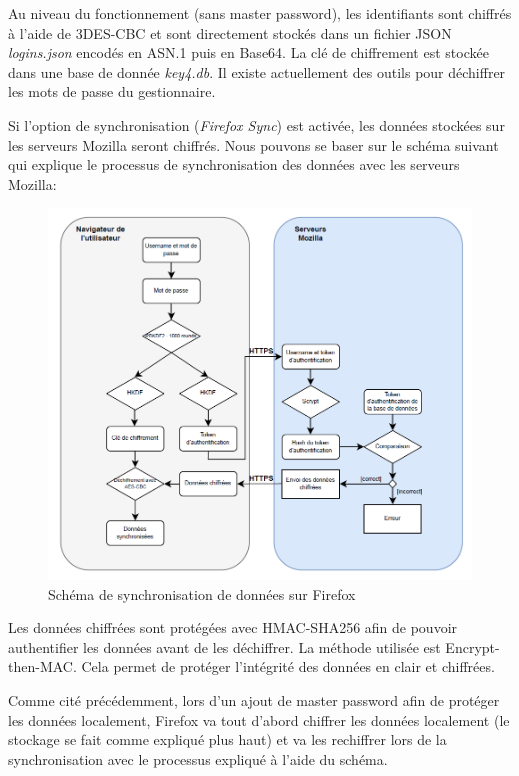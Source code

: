 Au niveau du fonctionnement\cite{firefoxEncr} (sans master password), les identifiants sont chiffrés à l'aide de 3DES-CBC et sont directement stockés dans un fichier JSON \textit{logins.json} encodés en ASN.1 puis en Base64. La clé de chiffrement est stockée dans une base de donnée \textit{key4.db}. Il existe actuellement des outils pour déchiffrer les mots de passe du gestionnaire.

Si l'option de synchronisation (\textit{Firefox Sync}) est activée\cite{firefoxsync}, les données stockées sur les serveurs Mozilla seront chiffrés. Nous pouvons se baser sur le schéma suivant qui explique le processus de synchronisation des données avec les serveurs Mozilla:
\begin{figure}[h!]
	\includegraphics[width=15.5cm]{images/firefox_sync.png}
		\centering
	\caption{Schéma de synchronisation de données sur Firefox}
\end{figure}

Les données chiffrées sont protégées avec HMAC-SHA256 afin de pouvoir authentifier les données avant de les déchiffrer. La méthode utilisée est Encrypt-then-MAC. Cela permet de protéger l'intégrité des données en clair et chiffrées.

Comme cité précédemment, lors d'un ajout de master password afin de protéger les données localement, Firefox va tout d'abord chiffrer les données localement (le stockage se fait comme expliqué plus haut) et va les rechiffrer lors de la synchronisation avec le processus expliqué à l'aide du schéma.

